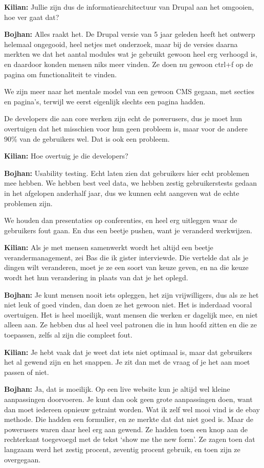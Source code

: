 \textbf{Kilian:} Jullie zijn dus de informatiearchitectuur van Drupal aan het omgooien, hoe ver gaat dat?

\textbf{Bojhan:} Alles raakt het. De Drupal versie van 5 jaar geleden heeft het ontwerp helemaal ongegooid, heel netjes met onderzoek, maar bij de versies daarna merkten we dat het aantal modules wat je gebruikt gewoon heel erg verhoogd is, en daardoor konden mensen niks meer vinden. Ze doen nu gewoon ctrl+f op de pagina om functionaliteit te vinden.

We zijn meer naar het mentale model van een gewoon CMS gegaan, met secties en pagina's, terwijl we eerst eigenlijk slechts een pagina hadden.

De developers die aan core werken zijn echt de powerusers, dus je moet hun overtuigen dat het misschien voor hun geen probleem is, maar voor de andere 90\% van de gebruikers wel. Dat is ook een probleem.

\textbf{Kilian:} Hoe overtuig je die developers?

\textbf{Bojhan:} Usability testing. Echt laten zien dat gebruikers hier echt problemen mee hebben. We hebben best veel data, we hebben zestig gebruikerstests gedaan in het afgelopen anderhalf jaar, dus we kunnen echt aangeven wat de echte problemen zijn.

We houden dan presentaties op conferenties, en heel erg uitleggen waar de gebruikers fout gaan. En dus een beetje pushen, want je veranderd werkwijzen.

\textbf{Kilian:} Als je met mensen samenwerkt wordt het altijd een beetje verandermanagement, zei Bas die ik gister interviewde. Die vertelde dat als je dingen wilt veranderen, moet je ze een soort van keuze geven, en na die keuze wordt het hun verandering in plaats van dat je het oplegd.

\textbf{Bojhan:} Je kunt mensen nooit iets opleggen, het zijn vrijwilligers, dus als ze het niet leuk of goed vinden, dan doen ze het gewoon niet. Het is inderdaad vooral overtuigen. Het is heel moeilijk, want mensen die werken er dagelijk mee, en niet alleen aan. Ze hebben dus al heel veel patronen die in hun hoofd zitten en die ze toepassen, zelfs al zijn die compleet fout.

\textbf{Kilian:} Je hebt vaak dat je weet dat iets niet optimaal is, maar dat gebruikers het al gewend zijn en het snappen. Je zit dan met de vraag of je het aan moet passen of niet.

\textbf{Bojhan:} Ja, dat is moeilijk. Op een live website kun je altijd wel kleine aanpassingen doorvoeren. Je kunt dan ook geen grote aanpassingen doen, want dan moet iedereen opnieuw getraint worden. Wat ik zelf wel mooi vind is de ebay methode. Die hadden een formulier, en ze merkte dat dat niet goed is. Maar de powerusers waren daar heel erg aan gewend. Ze hadden toen een knop aan de rechterkant toegevoegd met de tekst `show me the new form'. Ze zagen toen dat langzaam werd het zestig procent, zeventig procent gebruik, en toen zijn ze overgegaan.


